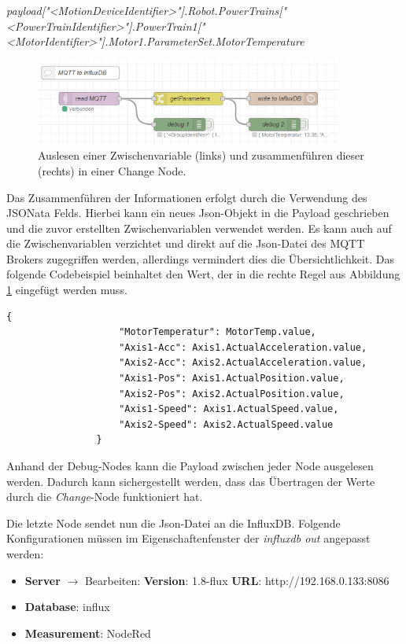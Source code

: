 \documentclass[a4paper, 12pt, oneside, toc=listofnumbered, bibliography=totoc]{scrbook}
\begin{document}
			\textit{payload["<MotionDeviceIdentifier>"].Robot.PowerTrains["<PowerTrainIdentifier>"]\linebreak.PowerTrain1["<MotorIdentifier>"].Motor1.ParameterSet.MotorTemperature}
			
			\begin{figure}[H]
				\centering
				\includegraphics[width=0.9\textwidth]{res/NodeRedFlow.png}
				\caption{Auslesen einer Zwischenvariable (links) und zusammenführen dieser (rechts) in einer Change Node.}
				\label{fig:NodeRedChange}
			\end{figure}
			
			Das Zusammenführen der Informationen erfolgt durch die Verwendung des JSONata Felds. Hierbei kann ein neues Json-Objekt in die Payload geschrieben und die zuvor erstellten Zwischenvariablen verwendet werden. Es kann auch auf die Zwischenvariablen verzichtet und direkt auf die Json-Datei des MQTT Brokers zugegriffen werden, allerdings vermindert dies die Übersichtlichkeit. Das folgende Codebeispiel beinhaltet den Wert, der in die rechte Regel aus Abbildung \ref{fig:NodeRedChange} eingefügt werden muss.
			
			\begin{lstlisting}[numbers=none, frame=single]
				{
					"MotorTemperatur": MotorTemp.value,
					"Axis1-Acc": Axis1.ActualAcceleration.value,
					"Axis2-Acc": Axis2.ActualAcceleration.value,
					"Axis1-Pos": Axis1.ActualPosition.value,
					"Axis2-Pos": Axis2.ActualPosition.value,
					"Axis1-Speed": Axis1.ActualSpeed.value,
					"Axis2-Speed": Axis2.ActualSpeed.value
				}
			\end{lstlisting}
		
			Anhand der Debug-Nodes kann die Payload zwischen jeder Node ausgelesen werden. Dadurch kann sichergestellt werden, dass das Übertragen der Werte durch die \textit{Change}-Node funktioniert hat. 
			
			Die letzte Node sendet nun die Json-Datei an die InfluxDB. Folgende Konfigurationen müssen im Eigenschaftenfenster der \textit{influxdb out} angepasst werden:
			
			\begin{itemize}
				\item \textbf{Server} $\rightarrow$ Bearbeiten:
				\subitem \textbf{Version}: 1.8-flux
				\subitem \textbf{URL}: http://192.168.0.133:8086
				\item \textbf{Database}: influx
				\item \textbf{Measurement}: NodeRed
			\end{itemize}
			
\end{document}
